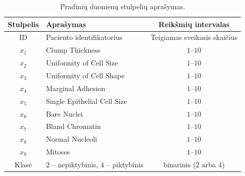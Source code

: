 \begin{table}[H]
    \centering
    \caption{Pradinių duomenų stulpelių aprašymas.}
    \begin{tabular}{|c|l|c|}
        \hline
        Stulpelis & Aprašymas & Reikšmių intervalas \\
        \hline
        ID & Paciento identifikatorius & Teigiamas sveikasis skaičius \\ \hline
        $x_1$ & Clump Thickness & $1–10$ \\ \hline
        $x_2$ & Uniformity of Cell Size & $1–10$ \\ \hline
        $x_3$ & Uniformity of Cell Shape & $1–10$ \\ \hline
        $x_4$ & Marginal Adhesion & $1–10$ \\ \hline
        $x_5$ & Single Epithelial Cell Size & $1–10$ \\ \hline
        $x_6$ & Bare Nuclei & $1–10$ \\ \hline
        $x_7$ & Bland Chromatin & $1–10$ \\ \hline
        $x_8$ & Normal Nucleoli & $1–10$ \\ \hline
        $x_9$ & Mitoses & $1–10$ \\ \hline
        Klasė & $2$ – nepiktybinis, $4$ – piktybinis & binarinis ($2$ arba $4$) \\ \hline
    \end{tabular}
    \label{tab:pradiniu_duomenu_aprasymas}
\end{table}